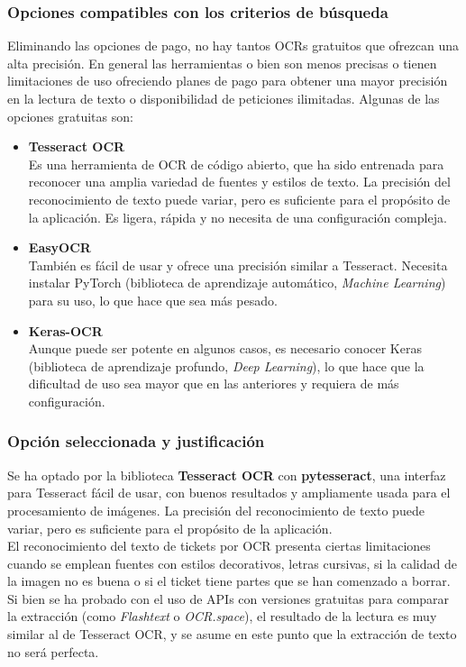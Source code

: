 \subsubsection{Opciones compatibles con los criterios de búsqueda}
Eliminando las opciones de pago, no hay tantos OCRs gratuitos que ofrezcan una alta precisión. En general las herramientas o bien son menos precisas o tienen limitaciones de uso ofreciendo planes de pago para obtener una mayor precisión en la lectura de texto o disponibilidad de peticiones ilimitadas. Algunas de las opciones gratuitas son:
\begin{itemize}
    \item \textbf{Tesseract OCR}\\
        Es una herramienta de OCR de código abierto, que ha sido entrenada para reconocer una amplia variedad de fuentes y estilos de texto. La precisión del reconocimiento de texto puede variar, pero es suficiente para el propósito de la aplicación. Es ligera, rápida y no necesita de una configuración compleja.
    \item \textbf{EasyOCR}\\
        También es fácil de usar y ofrece una precisión similar a Tesseract. Necesita instalar PyTorch (biblioteca de aprendizaje automático, \textit{Machine Learning}) para su uso, lo que hace que sea más pesado.
    \item \textbf{Keras-OCR}\\
        Aunque puede ser potente en algunos casos, es necesario conocer Keras (biblioteca de aprendizaje profundo, \textit{Deep Learning}), lo que hace que la dificultad de uso sea mayor que en las anteriores y requiera de más configuración. 
\end{itemize}

\subsubsection{Opción seleccionada y justificación}
Se ha optado por la biblioteca \textbf{Tesseract OCR} con \textbf{pytesseract}, una interfaz para Tesseract fácil de usar, con buenos resultados y ampliamente usada para el procesamiento de imágenes. La precisión del reconocimiento de texto puede variar, pero es suficiente para el propósito de la aplicación\cite{tesseract2023}.\\

El reconocimiento del texto de tickets por OCR presenta ciertas limitaciones cuando se emplean fuentes con estilos decorativos, letras cursivas, si la calidad de la imagen no es buena o si el ticket tiene partes que se han comenzado a borrar. Si bien se ha probado con el uso de APIs con versiones gratuitas para comparar la extracción (como \textit{Flashtext} o \textit{OCR.space}), el resultado de la lectura es muy similar al de Tesseract OCR, y se asume en este punto que la extracción de texto no será perfecta.

